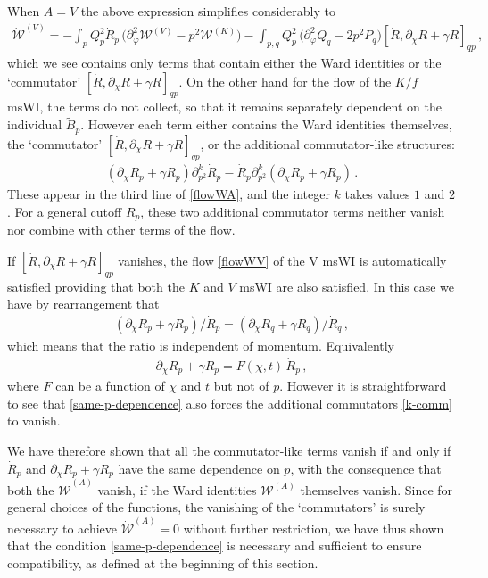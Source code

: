 \documentclass[11pt]{book}
\numberwithin{equation}{chapter}
\begin{document}
When $A = V$ the above expression simplifies considerably to
\begin{align}
\label{flowWV}
	 \mathcal{\dot W}^{(V)}=-  \int_p  Q^2_p  \dot R_p\, \bigg( \partial^2_{\varphi} \mathcal{W}^{(V)}
	  - p^2  \mathcal{W}^{(K)} \bigg) - \int_{p,q}   Q^2_p\, \bigg(  \partial_{\varphi}^2 Q_q
	  - 2 p^2 P_q \bigg) [ \dot R , \partial_{\chi} R + \gamma R ]_{qp} \,,
\end{align}
which we see contains only terms that contain either the Ward identities or the
`commutator' $[ \dot R , \partial_{\chi} R + \gamma R ]_{qp}$.
On the other hand for the flow of the $K/f$ msWI, the terms do not collect,
so that it remains separately dependent on the individual $\tilde B_p$.
However each term either contains the Ward identities themselves,
the `commutator'  $[ \dot R , \partial_{\chi} R + \gamma R ]_{qp}$,
or the additional commutator-like structures:
\begin{align}
  \label{k-comm}
  \left(\partial_\chi R_p + \gamma R_p\right) \partial_{p^2}^k \dot R_p - \dot R_p \partial_{p^2}^k \left(\partial_\chi R_p + \gamma R_p\right)\,.
\end{align}
These appear in the third line of \eqref{flowWA}, and the integer $k$ takes values $1$ and $2$.
For a general cutoff $R_p$, these two additional commutator terms neither vanish nor combine with
other terms of the flow.

If $[ \dot R , \partial_{\chi} R + \gamma R ]_{qp}$ vanishes,
the flow \eqref{flowWV} of the V msWI is automatically satisfied providing that both
the $K$ and $V$ msWI are also satisfied. In this case we have by rearrangement that
\begin{align}
  \left(
    \partial_\chi R_p + \gamma R_p
  \right)/\dot R_p = \left( \partial_\chi R_q + \gamma R_q \right)/\dot R_q\,,
\end{align}
which means that the ratio is independent of momentum. Equivalently
\begin{align}
  \label{same-p-dependence}
  \partial_\chi R_p + \gamma R_p = F(\chi,t) \,\dot R_p \,,
\end{align}
where $F$ can be a function of $\chi$ and $t$ but not of $p$.
However it is straightforward to see that \eqref{same-p-dependence} also forces the additional
commutators \eqref{k-comm} to vanish.

We have therefore shown that all the commutator-like terms vanish if and only if
$\dot R_p$ and $\partial_{\chi} R_p + \gamma R_p$ have the same dependence on $p$,
with the consequence  that both the $\mathcal{\dot W}^{(A)}$ vanish,
if the Ward identities $\mathcal{W}^{(A)}$ themselves vanish.
Since for general choices of the functions, the vanishing of the `commutators' is surely necessary
to achieve $\mathcal{\dot W}^{(A)}=0$ without further restriction,
we have thus shown that the condition \eqref{same-p-dependence} is necessary and sufficient to ensure
compatibility, as defined at the beginning of this section.
\end{document}
